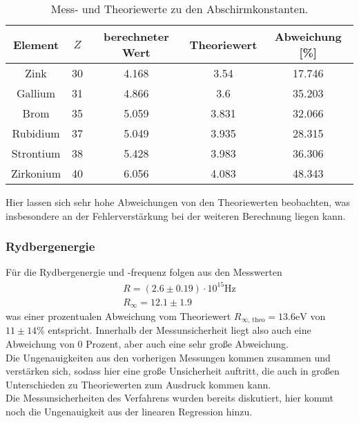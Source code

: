    \begin{table}
        \centering
        \caption{Mess- und Theoriewerte zu den Abschirmkonstanten.}
        \label{tab:abschirm}
        \begin{tabular}{c c c c c}
            \toprule 
            Element & $Z$ & berechneter Wert & Theoriewert & Abweichung [\%] \\
            \midrule
            Zink & 30 & 4.168 & 3.54 & 17.746 \\
            Gallium & 31 & 4.866 & 3.6 & 35.203 \\
            Brom & 35 & 5.059 & 3.831 & 32.066 \\
            Rubidium & 37 & 5.049 & 3.935 & 28.315 \\
            Strontium & 38 & 5.428 & 3.983 & 36.306 \\
            Zirkonium & 40 & 6.056 & 4.083 & 48.343 \\
            \bottomrule
        \end{tabular}
    \end{table}
    \FloatBarrier

    \noindent Hier lassen sich sehr hohe Abweichungen von den Theoriewerten beobachten, was insbesondere an der Fehlerverstärkung bei der weiteren Berechnung liegen kann. 
        
    \subsubsection{Rydbergenergie}
        Für die Rydbergenergie und -frequenz folgen aus den Messwerten
        \begin{align*}
            R = (2.6 \pm 0.19) \cdot 10^{15} \si{\Hz}\\
            R_{\infty} = 12.1 \pm 1.9
        \end{align*}
        was einer prozentualen Abweichung vom Theoriewert $R_{\infty \text{, theo}} = 13.6 \text{eV}$ von $11 \pm 14 \%$ entspricht. Innerhalb der Messunsicherheit liegt also
        auch eine Abweichung von 0 Prozent, aber auch eine sehr große Abweichung. \\
        Die Ungenauigkeiten aus den vorherigen Messungen kommen zusammen und verstärken sich, sodass hier eine große Unsicherheit auftritt, die auch in großen Unterschieden zu
        Theoriewerten zum Ausdruck kommen kann.\\
        Die Messunsicherheiten des Verfahrens wurden bereits diskutiert, hier kommt noch die Ungenauigkeit aus der linearen Regression hinzu.